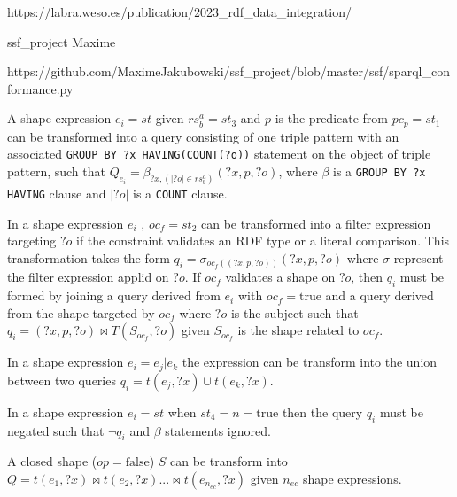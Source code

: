 https://labra.weso.es/publication/2023_rdf_data_integration/

ssf_project Maxime

https://github.com/MaximeJakubowski/ssf_project/blob/master/ssf/sparql_conformance.py

\fi

\begin{prop}\label{prop:triplePattern}
   A shape expression $e_i = st$ given $rs^a_b = st_3$ and $p$ is the predicate from $pc_p = st_1$
   can be transformed into a query consisting of one triple pattern with an associated \texttt{GROUP BY ?x HAVING(COUNT(?o))} statement on the object of triple pattern,
   such that
   $Q_{e_i} = \beta_{?x, (|?o| \in rs^a_b)}(?x, p, ?o)$,
   where $\beta$ is a \texttt{GROUP BY ?x HAVING} clause and $|?o|$ is a \texttt{COUNT} clause. 
\end{prop}

\begin{prop}
   In a shape expression $e_i$ , $oc_f = st_2$ can be transformed into a filter expression targeting $?o$ if the constraint validates an RDF type or a literal comparison.
   This transformation takes the form $q_{i} = \sigma_{oc_f((?x, p, ?o))}(?x, p, ?o)$ where $\sigma$ represent the filter expression applid on $?o$.
   If $oc_f$ validates a shape on $?o$, then $q_i$ must be formed by joining a query derived from $e_i$ with $oc_f = \mathrm{true}$ and a query derived from the shape targeted by $oc_f$ 
   where $?o$ is the subject such that $q_{i}= (?x, p, ?o) \bowtie T(S_{oc_f},?o)$ given $S_{oc_f}$ is the shape related to $oc_f$.
\end{prop}

\begin{prop}
   In a shape expression $e_i = e_j|e_k$ the expression can be transform into the union between two queries
   $q_{i} = t(e_j, ?x) \cup t(e_k, ?x)$.
\end{prop}

\begin{prop}
   In a shape expression $e_i = st$ when $st_4 = n = \mathrm{true}$ then the query $q_i$ must be negated such that $\neg q_i$ and $\beta$ statements ignored.
\end{prop}

\begin{prop}
   A closed shape ($op = \mathrm{false}$) $S$ can be transform into $Q = t(e_1, ?x) \bowtie t(e_2, ?x) ... \bowtie t(e_{n_{ec}}, ?x)$ given $n_{ec}$ shape expressions.
\end{prop}

